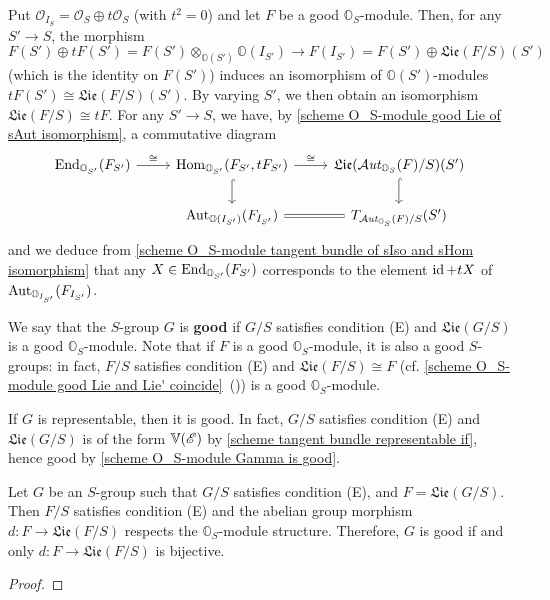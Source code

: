 \begin{remark}\label{scheme tangent space of Aut and infinitesimal endomorphism}
Put $\mathscr{O}_{I_S}=\mathscr{O}_S\oplus t\mathscr{O}_S$ (with $t^2=0$) and let $F$ be a good $\mathbb{O}_S$-module. Then, for any $S'\to S$, the morphism
\[F(S')\oplus tF(S')=F(S')\otimes_{\mathbb{O}(S')}\mathbb{O}(I_{S'})\to F(I_{S'})=F(S')\oplus\mathfrak{Lie}(F/S)(S')\]
(which is the identity on $F(S')$) induces an isomorphism of $\mathbb{O}(S')$-modules $tF(S')\cong\mathfrak{Lie}(F/S)(S')$. By varying $S'$, we then obtain an isomorphism $\mathfrak{Lie}(F/S)\cong tF$. For any $S'\to S$, we have, by \cref{scheme O_S-module good Lie of sAut isomorphism}, a commutative diagram
\[\begin{tikzcd}
\End_{\mathbb{O}_{S'}}(F_{S'})\ar[r,"\cong"]&\Hom_{\mathbb{O}_{S'}}(F_{S'},tF_{S'})\ar[r,"\cong"]\ar[d,hook]&\mathfrak{Lie}(\sAut_{\mathbb{O}_S}(F)/S)(S')\ar[d,hook]\\
&\Aut_{\mathbb{O}(I_{S'})}(F_{I_{S'}})\ar[r,equal]&T_{\sAut_{\mathbb{O}_S}(F)/S}(S')
\end{tikzcd}\]
and we deduce from \cref{scheme O_S-module tangent bundle of sIso and sHom isomorphism} that any $X\in\mathrm{End}_{\mathbb{O}_{S'}}(F_{S'})$ corresponds to the element $\operatorname{id}+tX$ of $\mathrm{Aut}_{\mathbb{O}_{I_{S'}}}(F_{I_{S'}})$.
\end{remark}

We say that the $S$-group $G$ is \textbf{good} if $G/S$ satisfies condition (E) and $\mathfrak{Lie}(G/S)$ is a good $\mathbb{O}_S$-module. Note that if $F$ is a good $\mathbb{O}_S$-module, it is also a good $S$-groups: in fact, $F/S$ satisfies condition (E) and $\mathfrak{Lie}(F/S)\cong F$ (cf. \cref{scheme O_S-module good Lie and Lie' coincide}~()) is a good $\mathbb{O}_S$-module.

\begin{example}\label{scheme group representable is good}
If $G$ is representable, then it is good. In fact, $G/S$ satisfies condition (E) and $\mathfrak{Lie}(G/S)$ is of the form $\mathbb{V}(\mathscr{E})$ by \cref{scheme tangent bundle representable if}, hence good by \cref{scheme O_S-module Gamma is good}.
\end{example}

\begin{lemma}\label{scheme group condition (E) Lie of Lie module morphism}
Let $G$ be an $S$-group such that $G/S$ satisfies condition (E), and $F=\mathfrak{Lie}(G/S)$. Then $F/S$ satisfies condition (E) and the abelian group morphism $d:F\to\mathfrak{Lie}(F/S)$ respects the $\mathbb{O}_S$-module structure. Therefore, $G$ is good if and only $d:F\to\mathfrak{Lie}(F/S)$ is bijective.
\end{lemma}
\begin{proof}

\end{proof}

